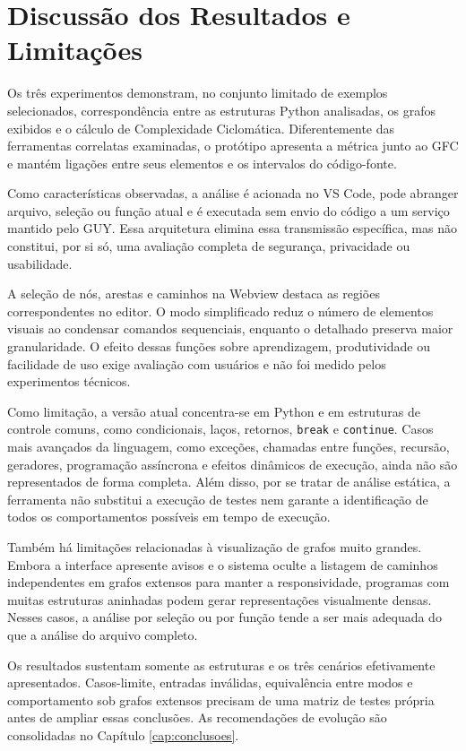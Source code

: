 \section{Discussão dos Resultados e Limitações}

Os três experimentos demonstram, no conjunto limitado de exemplos selecionados, correspondência entre as estruturas Python analisadas, os grafos exibidos e o cálculo de Complexidade Ciclomática. Diferentemente das ferramentas correlatas examinadas, o protótipo apresenta a métrica junto ao GFC e mantém ligações entre seus elementos e os intervalos do código-fonte.

Como características observadas, a análise é acionada no VS Code, pode abranger arquivo, seleção ou função atual e é executada sem envio do código a um serviço mantido pelo GUY. Essa arquitetura elimina essa transmissão específica, mas não constitui, por si só, uma avaliação completa de segurança, privacidade ou usabilidade.

A seleção de nós, arestas e caminhos na Webview destaca as regiões correspondentes no editor. O modo simplificado reduz o número de elementos visuais ao condensar comandos sequenciais, enquanto o detalhado preserva maior granularidade. O efeito dessas funções sobre aprendizagem, produtividade ou facilidade de uso exige avaliação com usuários e não foi medido pelos experimentos técnicos.

Como limitação, a versão atual concentra-se em Python e em estruturas de controle comuns, como condicionais, laços, retornos, \texttt{break} e \texttt{continue}. Casos mais avançados da linguagem, como exceções, chamadas entre funções, recursão, geradores, programação assíncrona e efeitos dinâmicos de execução, ainda não são representados de forma completa. Além disso, por se tratar de análise estática, a ferramenta não substitui a execução de testes nem garante a identificação de todos os comportamentos possíveis em tempo de execução.

Também há limitações relacionadas à visualização de grafos muito grandes. Embora a interface apresente avisos e o sistema oculte a listagem de caminhos independentes em grafos extensos para manter a responsividade, programas com muitas estruturas aninhadas podem gerar representações visualmente densas. Nesses casos, a análise por seleção ou por função tende a ser mais adequada do que a análise do arquivo completo.

Os resultados sustentam somente as estruturas e os três cenários efetivamente apresentados. Casos-limite, entradas inválidas, equivalência entre modos e comportamento sob grafos extensos precisam de uma matriz de testes própria antes de ampliar essas conclusões. As recomendações de evolução são consolidadas no Capítulo \ref{cap:conclusoes}.
